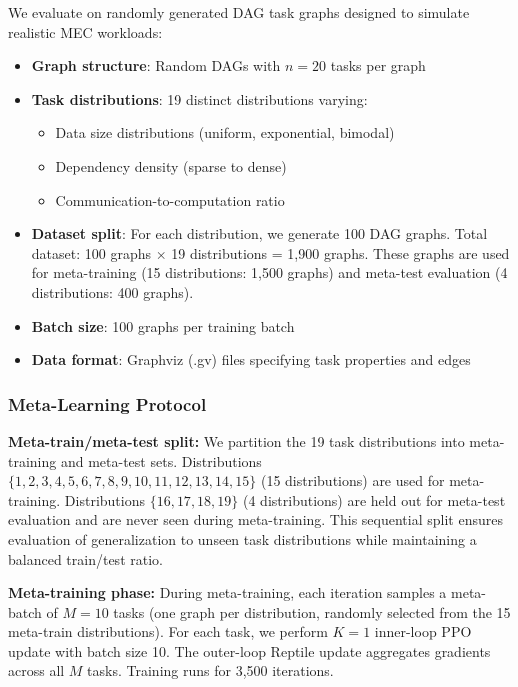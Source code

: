 \documentclass[journal,twoside]{IEEEtran}
\begin{document}
We evaluate on randomly generated DAG task graphs designed to simulate realistic MEC workloads:
\begin{itemize}
    \item \textbf{Graph structure}: Random DAGs with $n = 20$ tasks per graph
    \item \textbf{Task distributions}: 19 distinct distributions varying:
    \begin{itemize}
        \item Data size distributions (uniform, exponential, bimodal)
        \item Dependency density (sparse to dense)
        \item Communication-to-computation ratio
    \end{itemize}
    \item \textbf{Dataset split}: For each distribution, we generate 100 DAG graphs. Total dataset: 100 graphs $\times$ 19 distributions = 1,900 graphs. These graphs are used for meta-training (15 distributions: 1,500 graphs) and meta-test evaluation (4 distributions: 400 graphs).
    \item \textbf{Batch size}: 100 graphs per training batch
    \item \textbf{Data format}: Graphviz (.gv) files specifying task properties and edges
\end{itemize}

\subsubsection{Meta-Learning Protocol}

\textbf{Meta-train/meta-test split:} We partition the 19 task distributions into meta-training and meta-test sets. Distributions $\{1, 2, 3, 4, 5, 6, 7, 8, 9, 10, 11, 12, 13, 14, 15\}$ (15 distributions) are used for meta-training. Distributions $\{16, 17, 18, 19\}$ (4 distributions) are held out for meta-test evaluation and are never seen during meta-training. This sequential split ensures evaluation of generalization to unseen task distributions while maintaining a balanced train/test ratio.

\textbf{Meta-training phase:} During meta-training, each iteration samples a meta-batch of $M=10$ tasks (one graph per distribution, randomly selected from the 15 meta-train distributions). For each task, we perform $K=1$ inner-loop PPO update with batch size 10. The outer-loop Reptile update aggregates gradients across all $M$ tasks. Training runs for 3,500 iterations.
\end{document}
